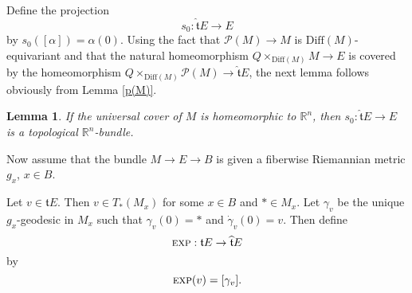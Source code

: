 \documentclass[onecolumn,notitlepage,11pt]{article}
\newcommand{\p}{\mathcal{P}}
\newcommand{\R}{\mathbb{R}}
\newcommand{\Diff}{\mbox{Diff}}
\newcommand{\beq}{\begin{equation*}}
\newcommand{\eeq}{\end{equation*}}
\newtheorem{lemma}{Lemma}[section]
\theoremstyle{definition}
\begin{document}
Define the projection
\beq
s_0:\widehat{\mathfrak{t}}E\to E
\eeq
by $s_0([\alpha])=\alpha(0)$. Using the fact that $\p(M)\to M$
is $\Diff(M)$-equivariant and that the natural homeomorphism
$Q\times_{\Diff(M)}M \to E$ is covered by the homeomorphism $Q\times_{\Diff(M)}\p(M)\to\widehat{\mathfrak{t}}E$, the next lemma follows obviously from Lemma \ref{p(M)}.
\begin{lemma}
If the universal cover of $M$ is homeomorphic to $\R^n$, then
$s_0:\widehat{\mathfrak{t}}E\to E$ is a topological $\R^n$-bundle.
\end{lemma}

Now assume that the bundle $M\to E\to B$ is
given a fiberwise Riemannian metric $g_x$,
$x\in B$.

Let $v\in\mathfrak{t}E$. Then $v\in T_{\ast}(M_x)$ for some $x\in B$ and
$\ast\in M_x$. Let $\gamma_v$ be the unique $g_x$-geodesic in $M_x$
such that $\gamma_v(0)=\ast$ and $\dot{\gamma}_v(0)=v$. Then define
\beq
\textsc{exp}:\mathfrak{t}E\to\widehat{\mathfrak{t}}E
\eeq
by
\beq
\textsc{exp}(v)=[\gamma_v].
\eeq
\end{document}

